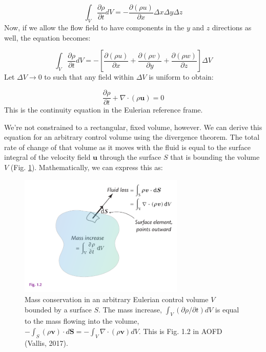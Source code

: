 \documentclass[12pt]{article}
\numberwithin{equation}{section}
\numberwithin{figure}{section}
\numberwithin{table}{section}
\begin{document}
\begin{equation}
  \int_V \frac{\partial \rho}{\partial t} dV =
  - \frac{\partial (\rho u)}{\partial x} \Delta x \Delta y \Delta z
\end{equation}
Now, if we allow the flow field to have components in the $y$ and $z$ directions
as well, the equation becomes:

\begin{equation}
  \int_V \frac{\partial \rho}{\partial t} dV =
  - \left[\frac{\partial (\rho u)}{\partial x} + \frac{\partial (\rho v)}{\partial y} + \frac{\partial (\rho w)}{\partial z} \right] \Delta V
\end{equation}
Let $\Delta V \to 0$ to such that any field within $\Delta V$ is uniform to obtain:

\begin{equation}
  \frac{\partial \rho}{\partial t} + \nabla \cdot (\rho \mathbf{u}) = 0
  \label{eq:continuity_eulerian}
\end{equation}
This is the continuity equation in the Eulerian reference frame.

We're not constrained to a rectangular, fixed volume, however.
We can derive this equation for an arbitrary control volume using the divergence
theorem.
The total rate of change of that volume as it moves with the fluid is equal to
the surface integral of the velocity field $\mathbf{u}$ through the surface
$S$ that is bounding the volume $V$ (Fig. \ref{fig:continuity2}).
Mathematically, we can express this as:

\begin{figure}[h]
  \centering
  \includegraphics[width=0.7\textwidth]{assets/fig_continuity2.pdf}
  \caption{
    Mass conservation in an arbitrary Eulerian control volume $V$ bounded by a
    surface $S$. The mass increase, $\int_V(\partial \rho/\partial t)dV$
    is equal to the mass flowing into the volume,
    $-\int_S(\rho\mathbf{v}) \cdot d\mathbf{S} = -\int_V \nabla \cdot (\rho\mathbf{v})dV$.
    This is Fig. 1.2 in AOFD (Vallis, 2017).
  }
  \label{fig:continuity2}
\end{figure}
\end{document}
